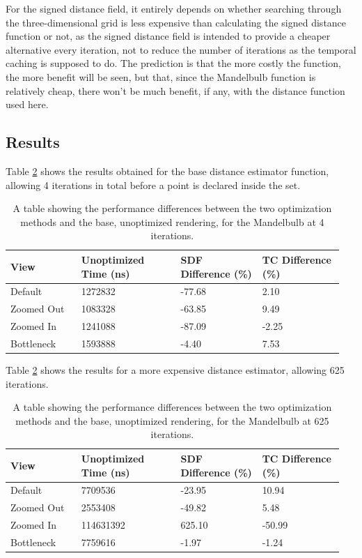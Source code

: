 For the signed distance field, it entirely depends on whether searching through the three-dimensional grid is less expensive than calculating the signed distance function or not, as the signed distance field is intended to provide a cheaper alternative every iteration, not to reduce the number of iterations as the temporal caching is supposed to do. The prediction is that the more costly the function, the more benefit will be seen, but that, since the Mandelbulb function is relatively cheap, there won't be much benefit, if any, with the distance function used here.

\subsection{Results}

Table \ref{table:mandelbulb-4-iterations} shows the results obtained for the base distance estimator function, allowing 4 iterations in total before a point is declared inside the set.

\begin{table}[ht]
	\centering
	\begin{tabular}{||p{0.2\linewidth}|p{0.29\linewidth}|p{0.23\linewidth}|p{0.23\linewidth}||}
		\hline
		View & Unoptimized Time (ns) & SDF Difference (\%) & TC Difference (\%)\\
		\hline\hline
		Default & 1272832 & -77.68 & 2.10\\
		\hline
		Zoomed Out & 1083328 & -63.85 & 9.49\\
		\hline
		Zoomed In & 1241088 & -87.09 & -2.25\\
		\hline
		Bottleneck & 1593888 & -4.40 & 7.53\\
		\hline
	\end{tabular}
	\caption{A table showing the performance differences between the two optimization methods and the base, unoptimized rendering, for the Mandelbulb at 4 iterations.}
	\label{table:mandelbulb-4-iterations}
\end{table}

Table \ref{table:mandelbulb-4-iterations} shows the results for a more expensive distance estimator, allowing 625 iterations.

\begin{table}[ht]
	\centering
	\begin{tabular}{||p{0.2\linewidth}|p{0.29\linewidth}|p{0.23\linewidth}|p{0.23\linewidth}||}
		\hline
		View & Unoptimized Time (ns) & SDF Difference (\%) & TC Difference (\%)\\
		\hline\hline
		Default & 7709536 & -23.95 & 10.94\\
		\hline
		Zoomed Out & 2553408 & -49.82 & 5.48\\
		\hline
		Zoomed In & 114631392 & 625.10 & -50.99\\
		\hline
		Bottleneck & 7759616 & -1.97 & -1.24\\
		\hline
	\end{tabular}
	\caption{A table showing the performance differences between the two optimization methods and the base, unoptimized rendering, for the Mandelbulb at 625 iterations.}
	\label{table:mandelbulb-4-iterations}
\end{table}

